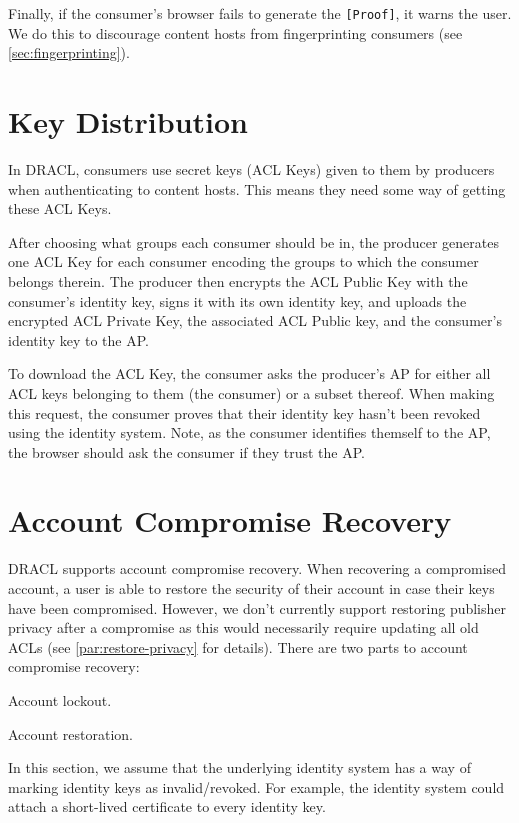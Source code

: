 \documentclass[pdftex,12pt,a4papaer,twoside,notitlepage]{report}
\begin{document}
Finally, if the consumer's browser fails to generate the \verb=[Proof]=, it
warns the user. We do this to discourage content hosts from fingerprinting
consumers (see \cref{sec:fingerprinting}).

\section{Key Distribution}

In DRACL, consumers use secret keys (ACL Keys) given to them by producers when
authenticating to content hosts. This means they need some way of getting these
ACL Keys.

After choosing what groups each consumer should be in, the producer generates
one ACL Key for each consumer encoding the groups to which the consumer belongs
therein. The producer then encrypts the ACL Public Key with the consumer's
identity key, signs it with its own identity key, and uploads the encrypted ACL
Private Key, the associated ACL Public key, and the consumer's identity key to
the AP.

To download the ACL Key, the consumer asks the producer's AP for either all ACL
keys belonging to them (the consumer) or a subset thereof. When making this
request, the consumer proves that their identity key hasn't been revoked using
the identity system. Note, as the consumer identifies themself to the AP, the
browser should ask the consumer if they trust the AP.

\section{Account Compromise Recovery}
\label{sec:revoke}

DRACL supports account compromise recovery. When recovering a compromised
account, a user is able to restore the security of their account in case their
keys have been compromised. However, we don't currently support restoring
publisher privacy after a compromise as this would necessarily require updating
all old ACLs (see \cref{par:restore-privacy} for details). There are two parts
to account compromise recovery:

\begin{compactenum}
\item Account lockout.
\item Account restoration.
\end{compactenum}

In this section, we assume that the underlying identity system has a way of
marking identity keys as invalid/revoked. For example, the identity system could
attach a short-lived certificate to every identity key.
\end{document}
